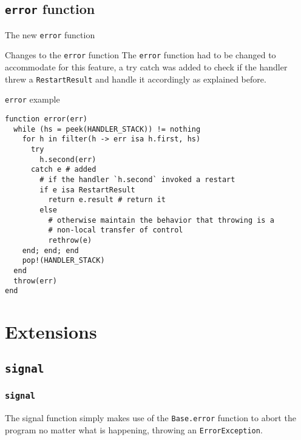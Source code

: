 \documentclass{beamer}
\begin{document}
\subsection{\texttt{error} function}
\begin{frame}{The new \texttt{error} function}
\begin{block}{Changes to the \texttt{error} function}
The \texttt{error} function had to be changed to accommodate for this feature, a try catch was added
to check if the handler threw a \texttt{RestartResult} and handle it accordingly as explained before.
\end{block}
\end{frame}
\begin{frame}[fragile]{\texttt{error} example}
\begin{verbatim}
function error(err)
  while (hs = peek(HANDLER_STACK)) != nothing
    for h in filter(h -> err isa h.first, hs)
      try
        h.second(err)
      catch e # added
        # if the handler `h.second` invoked a restart
        if e isa RestartResult
          return e.result # return it
        else
          # otherwise maintain the behavior that throwing is a
          # non-local transfer of control
          rethrow(e)
    end; end; end
    pop!(HANDLER_STACK)
  end
  throw(err)
end
\end{verbatim}
\end{frame}


\section{Extensions}
\subsection{\texttt{signal}}

\begin{frame}
\frametitle{\texttt{signal}}

\begin{block}{}
The signal function simply makes use of the \texttt{Base.error} function
to abort the program no matter what is happening, throwing an \texttt{ErrorException}.
\end{block}
\end{frame}

\end{document}
